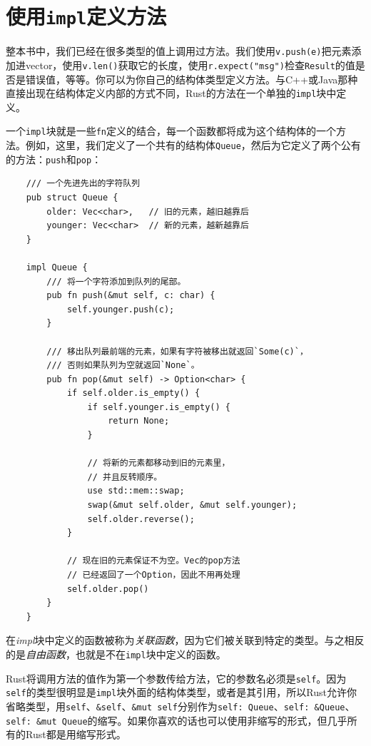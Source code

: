 \section{使用\texttt{impl}定义方法}\label{method}

整本书中，我们已经在很多类型的值上调用过方法。我们使用\texttt{v.push(e)}把元素添加进vector，使用\texttt{v.len()}获取它的长度，使用\texttt{r.expect("msg")}检查\texttt{Result}的值是否是错误值，等等。你可以为你自己的结构体类型定义方法。与C++或Java那种直接出现在结构体定义内部的方式不同，Rust的方法在一个单独的\texttt{impl}块中定义。

一个\texttt{impl}块就是一些\texttt{fn}定义的结合，每一个函数都将成为这个结构体的一个方法。例如，这里，我们定义了一个共有的结构体\texttt{Queue}，然后为它定义了两个公有的方法：\texttt{push}和\texttt{pop}：
\begin{verbatim}
    /// 一个先进先出的字符队列
    pub struct Queue {
        older: Vec<char>,   // 旧的元素，越旧越靠后
        younger: Vec<char>  // 新的元素，越新越靠后
    }

    impl Queue {
        /// 将一个字符添加到队列的尾部。
        pub fn push(&mut self, c: char) {
            self.younger.push(c);
        }

        /// 移出队列最前端的元素，如果有字符被移出就返回`Some(c)`，
        /// 否则如果队列为空就返回`None`。
        pub fn pop(&mut self) -> Option<char> {
            if self.older.is_empty() {
                if self.younger.is_empty() {
                    return None;
                }

                // 将新的元素都移动到旧的元素里，
                // 并且反转顺序。
                use std::mem::swap;
                swap(&mut self.older, &mut self.younger);
                self.older.reverse();
            }

            // 现在旧的元素保证不为空。Vec的pop方法
            // 已经返回了一个Option，因此不用再处理
            self.older.pop()
        }
    }
\end{verbatim}

在\emph{impl}块中定义的函数被称为\emph{关联函数}，因为它们被关联到特定的类型。与之相反的是\emph{自由函数}，也就是不在\texttt{impl}块中定义的函数。

Rust将调用方法的值作为第一个参数传给方法，它的参数名必须是\texttt{self}。因为\texttt{self}的类型很明显是\texttt{impl}块外面的结构体类型，或者是其引用，所以Rust允许你省略类型，用\texttt{self}、\texttt{\&self}、\texttt{\&mut self}分别作为\texttt{self: Queue}、\texttt{self: \&Queue}、\texttt{self: \&mut Queue}的缩写。如果你喜欢的话也可以使用非缩写的形式，但几乎所有的Rust都是用缩写形式。

